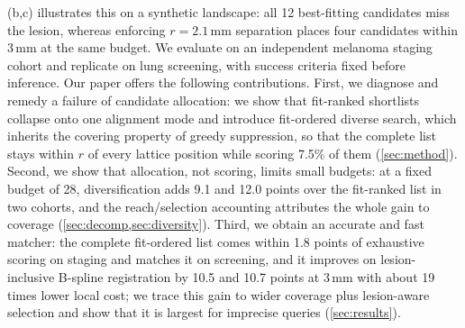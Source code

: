 (b,c) illustrates this on a synthetic landscape: all 12 best-fitting candidates miss the lesion, whereas enforcing $r=2.1$\,mm separation places four candidates within 3\,mm at the same budget.
We evaluate on an independent melanoma staging cohort and replicate on lung screening, with success criteria fixed before inference.
Our paper offers the following contributions.
First, we diagnose and remedy a failure of candidate allocation: we show that fit-ranked shortlists collapse onto one alignment mode and introduce fit-ordered diverse search, which inherits the covering property of greedy suppression, so that the complete list stays within $r$ of every lattice position while scoring 7.5\% of them (\cref{sec:method}).
Second, we show that allocation, not scoring, limits small budgets: at a fixed budget of 28, diversification adds 9.1 and 12.0 points over the fit-ranked list in two cohorts, and the reach/selection accounting attributes the whole gain to coverage (\cref{sec:decomp,sec:diversity}).
Third, we obtain an accurate and fast matcher: the complete fit-ordered list comes within 1.8 points of exhaustive scoring on staging and matches it on screening, and it improves on lesion-inclusive B-spline registration by 10.5 and 10.7 points at 3\,mm with about 19 times lower local cost; we trace this gain to wider coverage plus lesion-aware selection and show that it is largest for imprecise queries (\cref{sec:results}).
